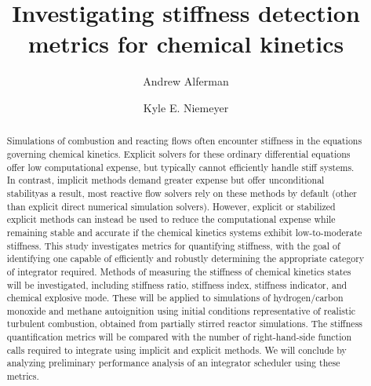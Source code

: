 \documentclass[12pt]{ussci}
\title{ Investigating stiffness detection metrics for chemical kinetics }
\author[1]{Andrew Alferman}
\author[1,*]{Kyle E. Niemeyer}
\affil[1]{School of Mechanical, Industrial, and Manufacturing Engineering\\
		Oregon State University, Corvallis, OR 97331, USA}
\affil[*]{Corresponding author: \email{Kyle.Niemeyer@oregonstate.edu}}
\begin{document}
\maketitle

\begin{abstract} %


Simulations of combustion and reacting flows often encounter stiffness in the equations governing chemical kinetics.
Explicit solvers for these ordinary differential equations offer low computational expense, but typically cannot efficiently handle stiff systems.
In contrast, implicit methods demand greater expense but offer unconditional stability\textendash as a result, most reactive flow solvers rely on these methods by default (other than explicit direct numerical simulation solvers).
However, explicit or stabilized explicit methods can instead be used to reduce the computational expense while remaining stable and accurate if the chemical kinetics systems exhibit low-to-moderate stiffness.
This study investigates metrics for quantifying stiffness, with the goal of identifying one capable of efficiently and robustly determining the appropriate category of integrator required.
Methods of measuring the stiffness of chemical kinetics states will be investigated, including stiffness ratio, stiffness index, stiffness indicator, and chemical explosive mode.
These will be applied to simulations of hydrogen/carbon monoxide and methane autoignition using initial conditions representative of realistic turbulent combustion, obtained from partially stirred reactor simulations.
The stiffness quantification metrics will be compared with the number of right-hand-side function calls required to integrate using implicit and explicit methods.
We will conclude by analyzing preliminary performance analysis of an integrator scheduler using these metrics.

\end{abstract}
\end{document}
